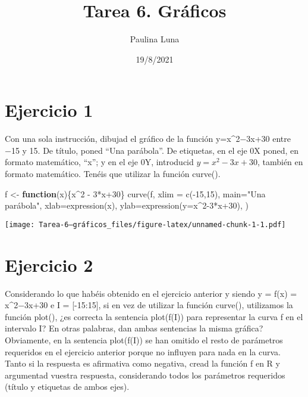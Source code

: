 \documentclass[
]{article}
\title{Tarea 6. Gráficos}
\author{Paulina Luna}
\date{19/8/2021}
\newenvironment{Shaded}{\begin{snugshade}}{\end{snugshade}}
\newcommand{\AttributeTok}[1]{\textcolor[rgb]{0.77,0.63,0.00}{#1}}
\newcommand{\ControlFlowTok}[1]{\textcolor[rgb]{0.13,0.29,0.53}{\textbf{#1}}}
\newcommand{\DecValTok}[1]{\textcolor[rgb]{0.00,0.00,0.81}{#1}}
\newcommand{\FunctionTok}[1]{\textcolor[rgb]{0.00,0.00,0.00}{#1}}
\newcommand{\NormalTok}[1]{#1}
\newcommand{\OtherTok}[1]{\textcolor[rgb]{0.56,0.35,0.01}{#1}}
\newcommand{\SpecialCharTok}[1]{\textcolor[rgb]{0.00,0.00,0.00}{#1}}
\newcommand{\StringTok}[1]{\textcolor[rgb]{0.31,0.60,0.02}{#1}}
\begin{document}
\maketitle

\hypertarget{ejercicio-1}{%
\section{Ejercicio 1}\label{ejercicio-1}}

Con una sola instrucción, dibujad el gráfico de la función
y=x\^{}2−3x+30 entre −15 y 15. De título, poned ``Una parábola''. De
etiquetas, en el eje 0X poned, en formato matemático, ``x''; y en el eje
0Y, introducid \(y=x^2−3x+30\), también en formato matemático. Tenéis
que utilizar la función curve().

\begin{Shaded}
\begin{Highlighting}[]
\NormalTok{f }\OtherTok{\textless{}{-}} \ControlFlowTok{function}\NormalTok{(x)\{x}\SpecialCharTok{\^{}}\DecValTok{2} \SpecialCharTok{{-}} \DecValTok{3}\SpecialCharTok{*}\NormalTok{x}\SpecialCharTok{+}\DecValTok{30}\NormalTok{\}}
\FunctionTok{curve}\NormalTok{(f, }\AttributeTok{xlim =} \FunctionTok{c}\NormalTok{(}\SpecialCharTok{{-}}\DecValTok{15}\NormalTok{,}\DecValTok{15}\NormalTok{), }\AttributeTok{main=}\StringTok{"Una parábola"}\NormalTok{, }\AttributeTok{xlab=}\FunctionTok{expression}\NormalTok{(x), }\AttributeTok{ylab=}\FunctionTok{expression}\NormalTok{(}\AttributeTok{y=}\NormalTok{x}\SpecialCharTok{\^{}}\DecValTok{2{-}3}\SpecialCharTok{*}\NormalTok{x}\SpecialCharTok{+}\DecValTok{30}\NormalTok{), )}
\end{Highlighting}
\end{Shaded}

\texttt{[image: Tarea-6--gráficos\_files/figure-latex/unnamed-chunk-1-1.pdf]}

\hypertarget{ejercicio-2}{%
\section{Ejercicio 2}\label{ejercicio-2}}

Considerando lo que habéis obtenido en el ejercicio anterior y siendo y
= f(x) = x\^{}2−3x+30 e I = {[}-15:15{]}, si en vez de utilizar la
función curve(), utilizamos la función plot(), ¿es correcta la sentencia
plot(f(I)) para representar la curva f en el intervalo I? En otras
palabras, dan ambas sentencias la misma gráfica? Obviamente, en la
sentencia plot(f(I)) se han omitido el resto de parámetros requeridos en
el ejercicio anterior porque no influyen para nada en la curva. Tanto si
la respuesta es afirmativa como negativa, cread la función f en R y
argumentad vuestra respuesta, considerando todos los parámetros
requeridos (título y etiquetas de ambos ejes).
\end{document}
